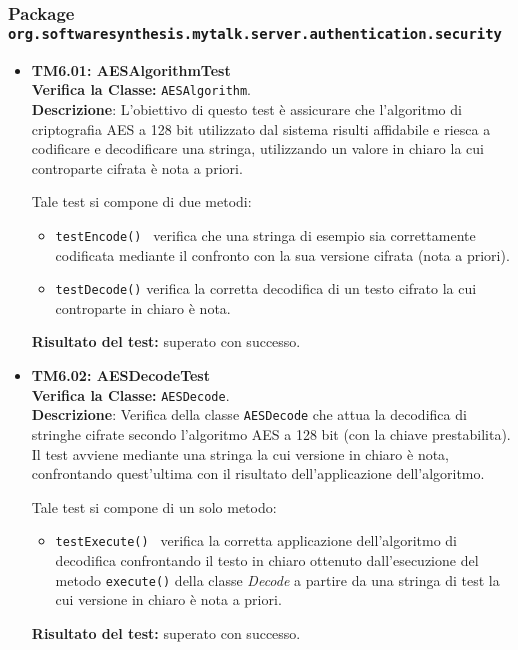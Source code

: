 \subsubsection{Package \texttt{org.softwaresynthesis.mytalk.server.authentication.security}}
\begin{itemize}

\item[\passed] \textbf{TM6.01: AESAlgorithmTest}\\
\textbf{Verifica la Classe:} \texttt{AESAlgorithm}.\\
\textbf{Descrizione}: L'obiettivo di questo test è assicurare che l'algoritmo di criptografia AES a 128 bit utilizzato dal sistema \caName{} risulti affidabile e riesca a codificare e decodificare una stringa, utilizzando un valore in chiaro la cui controparte cifrata è nota a priori.

Tale test si compone di due metodi:
\begin{itemize}
\item \texttt{testEncode() } verifica che una stringa di esempio sia correttamente codificata mediante il confronto con la sua versione cifrata (nota a priori).

\item \texttt{testDecode()} verifica la corretta decodifica di un testo cifrato la cui controparte in chiaro è nota.
\end{itemize}
\textbf{Risultato del test:} superato con successo.


\item[\passed] \textbf{TM6.02: AESDecodeTest}\\
\textbf{Verifica la Classe:} \texttt{AESDecode}.\\
\textbf{Descrizione}: Verifica della classe \texttt{AESDecode} che attua la decodifica di stringhe cifrate secondo l'algoritmo AES a 128 bit (con la chiave prestabilita). Il test avviene mediante una stringa la cui versione in chiaro è nota, confrontando quest'ultima con il risultato dell'applicazione dell'algoritmo.

Tale test si compone di un solo metodo:
\begin{itemize}
\item \texttt{testExecute() } verifica la corretta applicazione dell'algoritmo di decodifica confrontando il testo in chiaro ottenuto dall'esecuzione del metodo \texttt{execute()} della classe \textit{Decode} a partire da una stringa di test la cui versione in chiaro è nota a priori.
\end{itemize}
\textbf{Risultato del test:} superato con successo.



\end{itemize}

